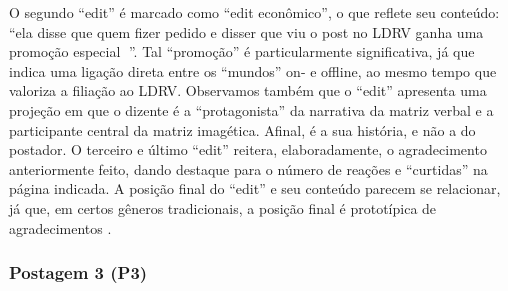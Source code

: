 \documentclass{textolivre}
\begin{document}
O segundo “edit” é marcado como “edit econômico”, o que reflete seu conteúdo: “ela disse que quem fizer pedido e disser que viu o post no LDRV ganha uma promoção especial {\Symbola 💖}”. Tal “promoção” é particularmente significativa, já que indica uma ligação direta entre os “mundos” on- e offline, ao mesmo tempo que valoriza a filiação ao LDRV. Observamos também que o “edit” apresenta uma projeção em que o dizente é a “protagonista” da narrativa da matriz verbal e a participante central da matriz imagética. Afinal, é a sua história, e não a do postador. O terceiro e último “edit” reitera, elaboradamente, o agradecimento anteriormente feito, dando destaque para o número de reações e “curtidas” na página indicada. A posição final do “edit” e seu conteúdo parecem se relacionar, já que, em certos gêneros tradicionais, a posição final é prototípica de agradecimentos \cite{henry2001}.

\subsubsection{Postagem 3 (P3)}\label{sec-postagem3}
\end{document}
